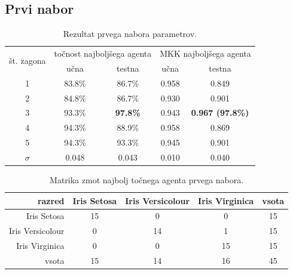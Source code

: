 \subsection{Prvi nabor}\label{subsec:dodatek-iris-prvi-nabor}
\begin{table}[H]
    \begin{center}
        \begin{tabular}{|| c | c c || c c ||}
            \hline
            \multirow{2}{*}{št. zagona} & \multicolumn{2}{c||}{točnost najboljšega agenta} & \multicolumn{2}{c||}{MKK najboljšega agenta} \\ \cline{2-5}
            & učna   & testna          & učna  & testna                  \\
            \hline
            1        & 83.8\% & 86.7\%          & 0.958 & 0.849                   \\
            \hline
            2        & 84.8\% & 86.7\%          & 0.930 & 0.901                   \\
            \hline
            3        & 93.3\% & \textbf{97.8\%} & 0.943 & \textbf{0.967 (97.8\%)} \\
            \hline
            4        & 94.3\% & 88.9\%          & 0.958 & 0.869                   \\
            \hline
            5        & 94.3\% & 93.3\%          & 0.945 & 0.901                   \\
            \hline
            $\sigma$ & 0.048  & 0.043           & 0.010 & 0.040                   \\
            \hline
        \end{tabular}
    \end{center}
    \caption{Rezultat prvega nabora parametrov.}
    \label{tab:iris_result_1}
\end{table}

\begin{table}[H]
    \centering
    \begin{tabular}{||rcccc||}
        \hline
        razred           & Iris Setosa & Iris Versicolour & Iris Virginica & vsota \\ \hline
        Iris Setosa      & 15          & 0                & 0              & 15    \\ \hline
        Iris Versicolour & 0           & 14               & 1              & 15    \\ \hline
        Iris Virginica   & 0           & 0                & 15             & 15    \\ \hline
        vsota            & 15          & 14               & 16             & 45    \\ \hline
    \end{tabular}
    \caption{Matrika zmot najbolj točnega agenta prvega nabora.}
    \label{tab:iris_acc_1}
\end{table}

